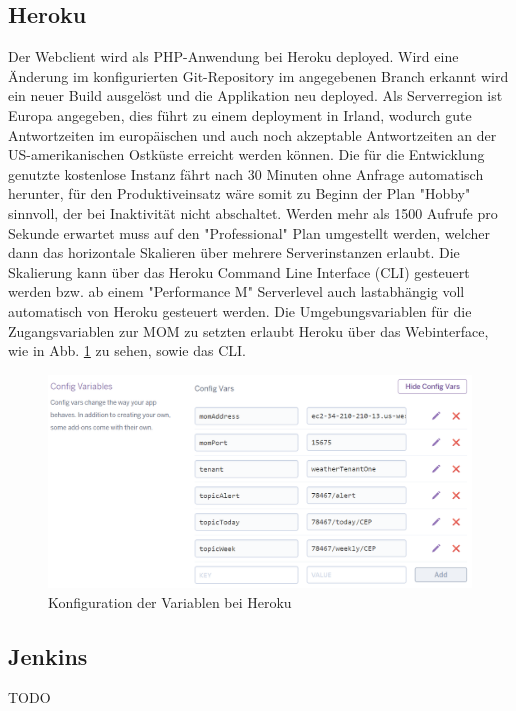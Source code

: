 \subsection{Heroku}\label{Heroku}
Der Webclient wird als PHP-Anwendung bei Heroku deployed. Wird eine Änderung im konfigurierten Git-Repository  im angegebenen Branch erkannt wird ein neuer Build ausgelöst und die Applikation neu deployed. Als Serverregion ist Europa angegeben, dies führt zu einem deployment in Irland, wodurch gute Antwortzeiten im europäischen und auch noch akzeptable Antwortzeiten an der US-amerikanischen Ostküste erreicht werden können. Die für die Entwicklung genutzte kostenlose Instanz fährt nach 30 Minuten ohne Anfrage automatisch herunter, für den Produktiveinsatz wäre somit zu Beginn der Plan "Hobby" sinnvoll, der bei Inaktivität nicht abschaltet. Werden mehr als 1500 Aufrufe pro Sekunde erwartet muss auf den "Professional" Plan umgestellt werden, welcher dann das horizontale Skalieren über mehrere Serverinstanzen erlaubt. Die Skalierung kann über das Heroku Command Line Interface (CLI) gesteuert werden bzw. ab einem "Performance M" Serverlevel auch lastabhängig voll automatisch von Heroku gesteuert werden. Die Umgebungsvariablen für die Zugangsvariablen zur MOM zu setzten erlaubt Heroku über das Webinterface, wie in Abb. \ref{img:herokuConf} zu sehen, sowie das CLI.
\begin{figure}[htbp]
	\centering
	\includegraphics[width=1.0\textwidth]{Bilder/Web-herokuEnv.PNG}
	\caption{Konfiguration der Variablen bei Heroku}
	\label{img:herokuConf}
\end{figure} 


\subsection{Jenkins}\label{Jenkins}
TODO
